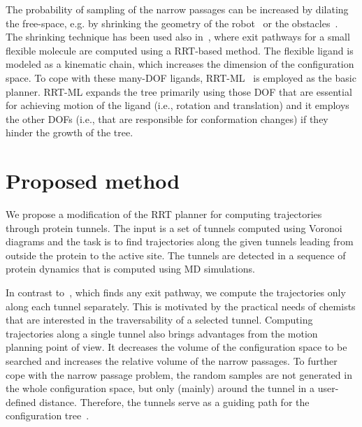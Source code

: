 \documentclass[usletter, 10pt, conference]{ieeeconf} %
\begin{document}
The probability of sampling of the narrow passages can be increased by dilating the free-space, e.g. by shrinking the geometry of 
the robot~\cite{hsuOnProb} or the obstacles~\cite{bayazitIRC}.
The shrinking technique has been used also in~\cite{cortes2010simulating}, where exit pathways for a small flexible molecule are
computed using a RRT-based method.
The flexible ligand is modeled as a kinematic chain, which increases the dimension of the configuration space.
To cope with these many-DOF ligands, RRT-ML~\cite{cortes2007mlrrt} is employed as the basic planner.
RRT-ML expands the tree primarily using those DOF that are essential for achieving motion of the ligand (i.e., rotation
and translation) and it employs the other DOFs (i.e., that are responsible for conformation changes) if they hinder the growth of the tree.




\section{Proposed method}


We propose a modification of the RRT planner for computing trajectories through protein tunnels.
The input is a set of tunnels computed using Voronoi diagrams and the task is to find trajectories along the given tunnels
leading from outside the protein to the active site.
The tunnels are detected in a sequence of protein dynamics that is computed using MD simulations. 

In contrast to~\cite{cortes2010simulating}, which finds any exit pathway, we compute the trajectories only along each tunnel separately.
This is motivated by the practical needs of chemists that are interested in the traversability of a selected tunnel.
Computing trajectories along a single tunnel also brings advantages from the motion planning point of view.
It decreases the volume of the configuration space to be searched  and increases the relative volume of the narrow passages.
To further cope with the narrow passage problem, the random samples are not generated in the whole configuration space, but only (mainly) around
the tunnel in a user-defined distance.
Therefore, the tunnels serve as a guiding path for the configuration tree~\cite{vonasek2009rrt}.
\end{document}
